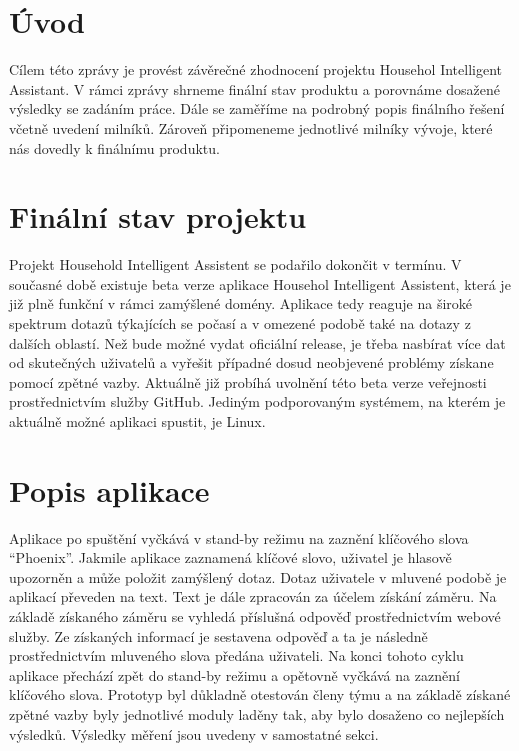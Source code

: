 \documentclass[12pt,a4paper]{article}
\begin{document}
\newpage
\pagestyle{plain}     %
\setcounter{page}{1}
\addtolength{\voffset}{-3cm}
\addtolength{\headheight}{2cm}

\pagestyle{fancy}
\lfoot{}
\cfoot{\thepage}
\rfoot{}
\renewcommand{\headrulewidth}{0.4pt}

\tableofcontents

\newpage
\section{Úvod}
Cílem této zprávy je provést závěrečné zhodnocení projektu Househol Intelligent Assistant. V rámci zprávy shrneme finální stav produktu a porovnáme dosažené výsledky se zadáním práce. Dále se zaměříme na podrobný popis finálního řešení včetně uvedení milníků. Zároveň připomeneme jednotlivé milníky vývoje, které nás dovedly k finálnímu produktu. 
\section{Finální stav projektu}
Projekt Household Intelligent Assistent se podařilo dokončit v termínu. V současné době existuje beta verze aplikace Househol Intelligent Assistent, která je již plně funkční v rámci zamýšlené domény. Aplikace tedy reaguje na široké spektrum dotazů týkajících se počasí a v omezené podobě také na dotazy z dalších oblastí. Než bude možné vydat oficiální release, je třeba nasbírat více dat od skutečných uživatelů a vyřešit případné dosud neobjevené problémy získane pomocí zpětné vazby. Aktuálně již probíhá uvolnění této beta verze veřejnosti prostřednictvím služby GitHub. Jediným podporovaným systémem, na kterém je aktuálně možné aplikaci spustit, je Linux. 
\section{Popis aplikace}
Aplikace po spuštění vyčkává v stand-by režimu na zaznění klíčového slova “Phoenix”. Jakmile aplikace zaznamená klíčové slovo, uživatel je hlasově upozorněn a může položit zamýšlený dotaz. Dotaz uživatele v mluvené podobě je aplikací převeden na text. Text je dále zpracován za účelem získání záměru. Na základě získaného záměru se vyhledá příslušná odpověď prostřednictvím webové služby. Ze získaných informací je sestavena odpověď a ta je následně prostřednictvím mluveného slova předána uživateli. Na konci tohoto cyklu aplikace  přechází zpět do stand-by režimu a opětovně vyčkává na zaznění klíčového slova.
Prototyp byl důkladně otestován členy týmu a na základě získané zpětné vazby byly jednotlivé moduly laděny tak, aby bylo dosaženo co nejlepších výsledků. Výsledky měření jsou uvedeny v samostatné sekci.
\end{document}
